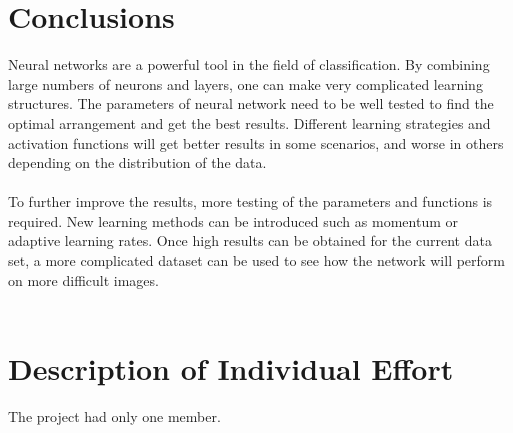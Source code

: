 \documentclass[12pt,twoside]{article} %
\begin{document}
  \section{Conclusions}
  Neural networks are a powerful tool in the field of classification. By combining large numbers of neurons and layers, one can make very complicated learning structures. The parameters of neural network need to be well tested to find the optimal arrangement and get the best results. Different learning strategies and activation functions will get better results in some scenarios, and worse in others depending on the distribution of the data.
  \\\\
  To further improve the results, more testing of the parameters and functions is required. New learning methods can be introduced such as momentum or adaptive learning rates. Once high results can be obtained for the current data set, a more complicated dataset can be used to see how the network will perform on more difficult images. 
  \\\\
  
  \section{Description of Individual Effort}
  The project had only one member.


\parskip=0pt
\parsep=0pt



\end{document}
